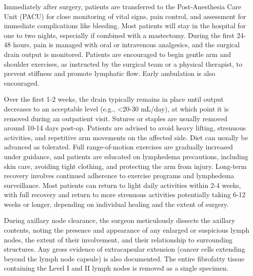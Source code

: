 Immediately after surgery, patients are transferred to the Post-Anesthesia Care Unit (PACU) for close monitoring of vital signs, pain control, and assessment for immediate complications like bleeding. Most patients will stay in the hospital for one to two nights, especially if combined with a mastectomy. During the first 24-48 hours, pain is managed with oral or intravenous analgesics, and the surgical drain output is monitored. Patients are encouraged to begin gentle arm and shoulder exercises, as instructed by the surgical team or a physical therapist, to prevent stiffness and promote lymphatic flow. Early ambulation is also encouraged.

Over the first 1-2 weeks, the drain typically remains in place until output decreases to an acceptable level (e.g., <20-30 mL/day), at which point it is removed during an outpatient visit. Sutures or staples are usually removed around 10-14 days post-op. Patients are advised to avoid heavy lifting, strenuous activities, and repetitive arm movements on the affected side. Diet can usually be advanced as tolerated. Full range-of-motion exercises are gradually increased under guidance, and patients are educated on lymphedema precautions, including skin care, avoiding tight clothing, and protecting the arm from injury. Long-term recovery involves continued adherence to exercise programs and lymphedema surveillance. Most patients can return to light daily activities within 2-4 weeks, with full recovery and return to more strenuous activities potentially taking 6-12 weeks or longer, depending on individual healing and the extent of surgery.

During axillary node clearance, the surgeon meticulously dissects the axillary contents, noting the presence and appearance of any enlarged or suspicious lymph nodes, the extent of their involvement, and their relationship to surrounding structures. Any gross evidence of extracapsular extension (cancer cells extending beyond the lymph node capsule) is also documented. The entire fibrofatty tissue containing the Level I and II lymph nodes is removed as a single specimen.

